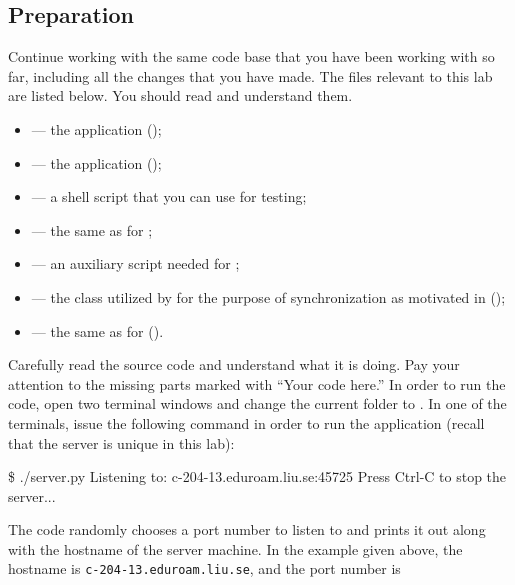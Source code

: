 \documentclass[a4paper]{article}
\begin{document}
\subsection{Preparation}
Continue working with the same code base that you have been working with so far,
including all the changes that you have made. The files relevant to this lab are
listed below. You should read and understand them.
\begin{itemize}

  \item {} --- the  application (\fix);

  \item {} --- the  application (\fix);

  \item {} --- a shell script that you can use for testing;

  \item {} --- the same as for ;

  \item {} --- an auxiliary script needed for
  ;

  \item {} --- the class utilized
  by  for the purpose of synchronization as motivated in
   (\leave);

  \item {} --- the same as for 
  (\overwrite).

\end{itemize}
Carefully read the source code and understand what it is doing. Pay your
attention to the missing parts marked with ``Your code here.'' In order to run
the code, open two terminal windows and change the current folder to
. In one of the terminals, issue the following command in order
to run the  application (recall that the server is unique in
this lab):
\begin{shell}
\$ ./server.py
Listening to: c-204-13.eduroam.liu.se:45725
Press Ctrl-C to stop the server...
\end{shell}
The code randomly chooses a port number to listen to and prints it out along
with the hostname of the server machine. In the example given above, the
hostname is \texttt{c-204-13.eduroam.liu.se}, and the port number is
\end{document}
